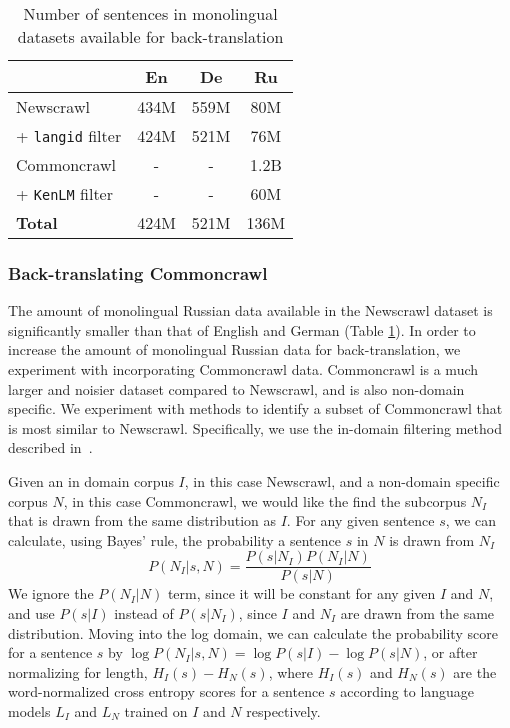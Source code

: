 \documentclass[11pt,a4paper]{article}
\begin{document}
\begin{table}[t]
\centering
\begin{tabular}{lccc}
\toprule
& En & De & Ru \\ \midrule
Newscrawl & 434M & 559M & 80M \\
+ \texttt{langid} filter & 424M & 521M & 76M\\
\midrule
Commoncrawl & - & - & 1.2B \\
+ \texttt{KenLM} filter & - & - & 60M \\
\midrule
\textbf{Total} & 424M & 521M & 136M \\
\bottomrule
\end{tabular}
\caption{Number of sentences in monolingual datasets available for back-translation}
\label{tab:monolingual_size}
\end{table}

\subsubsection{Back-translating Commoncrawl}
\label{subsection:btcc}
The amount of monolingual Russian data available in the Newscrawl dataset is significantly smaller than that of English and German (Table \ref{tab:monolingual_size}).
In order to increase the amount of monolingual Russian data for back-translation, we experiment with incorporating Commoncrawl data.
Commoncrawl is a much larger and noisier dataset compared to Newscrawl, and is also non-domain specific.
We experiment with methods to identify a subset of Commoncrawl that is most similar to Newscrawl.
Specifically, we use the in-domain filtering method described in~\citet{moore2010intelligent}.

Given an in domain corpus $I$, in this case Newscrawl, and a non-domain specific corpus $N$, in this case Commoncrawl, we would like the find the subcorpus $N_I$ that is drawn from the same distribution as $I$.
For any given sentence $s$, we can calculate, using Bayes' rule, the probability a sentence $s$ in $N$ is drawn from $N_I$
\begin{equation}
    P(N_I | s, N) = \frac{P(s|N_I)P(N_I|N)}{P(s|N)
}\end{equation}
We ignore the $P(N_I|N)$ term, since it will be constant for any given $I$ and $N$, and use $P(s|I)$ instead of $P(s|N_I)$, since $I$ and $N_I$ are drawn from the same distribution.
Moving into the log domain, we can calculate the probability score for a sentence $s$ by $\log P(N_I | s, N) = \log P(s|I) - \log P(s|N)$, or after normalizing for length, $H_I(s) - H_N(s)$, where $H_I(s)$ and $H_N(s)$ are the word-normalized cross entropy scores for a sentence $s$ according to language models $L_I$ and $L_N$ trained on $I$ and $N$ respectively.
\end{document}
